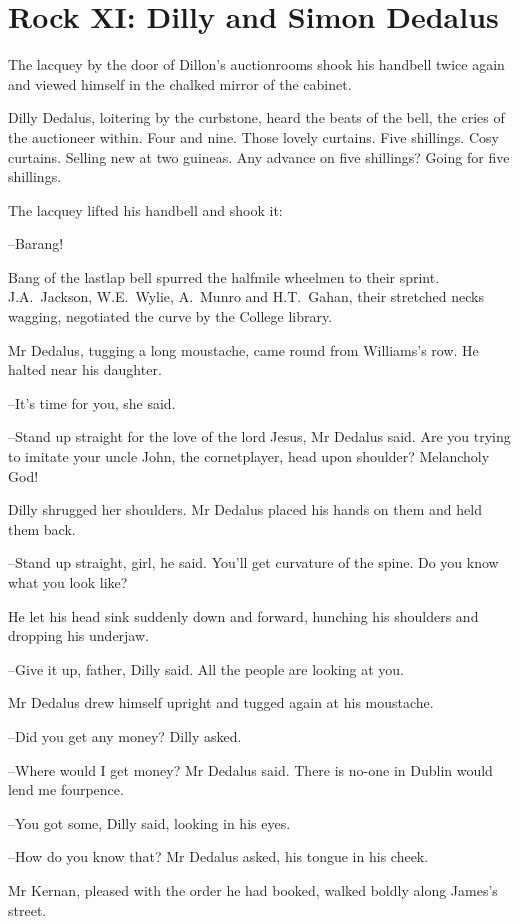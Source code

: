 \section*{Rock XI: Dilly and Simon Dedalus}


The lacquey by the door of Dillon's auctionrooms
shook his handbell
twice again
and viewed himself in the chalked mirror of the cabinet.

Dilly Dedalus, loitering by the curbstone,
heard the beats of the bell,
the cries of the auctioneer within.
Four and nine.
Those lovely curtains.
Five shillings.
Cosy curtains.
Selling new at two guineas.
Any advance on
five shillings?
Going for five shillings.

The lacquey lifted his handbell and shook it:

--Barang!%

Bang of the lastlap bell
spurred the halfmile wheelmen to their sprint.
J.A.~Jackson,
W.E.~Wylie,
A.~Munro
and H.T.~Gahan,
their stretched
necks wagging,
negotiated the curve by the College library.

Mr Dedalus,
tugging a long moustache,
came round from Williams's
row.
He halted near his daughter.

--It's time for you,
she said.

--Stand up straight for the love of the lord Jesus,
Mr Dedalus said.
Are
you trying to imitate your uncle John, the cornetplayer,
head upon
shoulder?
Melancholy God!

Dilly shrugged her shoulders.
Mr Dedalus placed his hands on them
and held them back.

--Stand up straight, girl,
he said.
You'll get curvature of the spine.
Do you know what you look like?

He let his head sink suddenly down and forward,
hunching his
shoulders and dropping his underjaw.

--Give it up, father,
Dilly said.
All the people are looking at you.

Mr Dedalus drew himself upright
and tugged again at his moustache.

--Did you get any money?
Dilly asked.

--Where would I get money?
Mr Dedalus said.
There is no-one in Dublin would lend me fourpence.%

--You got some,
Dilly said,
looking in his eyes.

--How do you know that?
Mr Dedalus asked,
his tongue in his cheek.

Mr Kernan,
pleased with the order he had booked,
walked boldly
along James's street.


